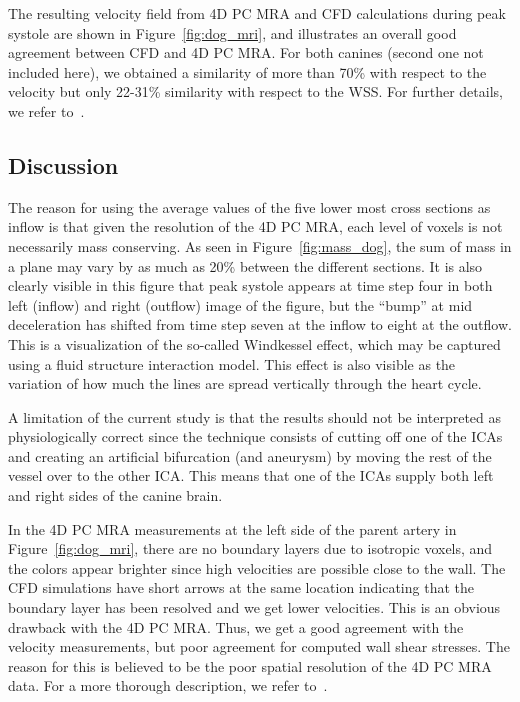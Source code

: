 The resulting velocity field from 4D PC MRA and CFD calculations
during peak systole are shown in Figure~\ref{fig:dog_mri}, and
illustrates an overall good agreement between CFD and 4D PC MRA. For
both canines (second one not included here), we obtained a similarity
of more than 70\% with respect to the velocity but only 22-31\%
similarity with respect to the WSS. For further details, we refer
to~\cite{doggy}.

\subsection{Discussion}

The reason for using the average values of the five lower most cross
sections as inflow is that given the resolution of the 4D PC MRA, each
level of voxels is not necessarily mass conserving. As seen in
Figure~\ref{fig:mass_dog}, the sum of mass in a plane may vary by as
much as 20\% between the different sections.  It is also clearly
visible in this figure that peak systole appears at time step four in
both left (inflow) and right (outflow) image of the figure, but the
``bump'' at mid deceleration has shifted from time step seven at the
inflow to eight at the outflow.  This is a visualization of the
so-called Windkessel effect, which may be captured using a fluid
structure interaction model. This effect is also visible as the
variation of how much the lines are spread vertically through the
heart cycle.


A limitation of the current study is that the results should not be
interpreted as physiologically correct since the technique consists of
cutting off one of the ICAs and creating an artificial bifurcation
(and aneurysm) by moving the rest of the vessel over to the other
ICA. This means that one of the ICAs supply both left and right sides
of the canine brain.

In the 4D PC MRA measurements at the left side of the parent artery in
Figure~\ref{fig:dog_mri}, there are no boundary layers due to
isotropic voxels, and the colors appear brighter since high velocities
are possible close to the wall.  The CFD simulations have short arrows
at the same location indicating that the boundary layer has been
resolved and we get lower velocities. This is an obvious drawback with
the 4D PC MRA. Thus, we get a good agreement with the velocity
measurements, but poor agreement for computed wall shear stresses. The
reason for this is believed to be the poor spatial resolution of the
4D PC MRA data. For a more thorough description, we refer
to~\cite{doggy}.

